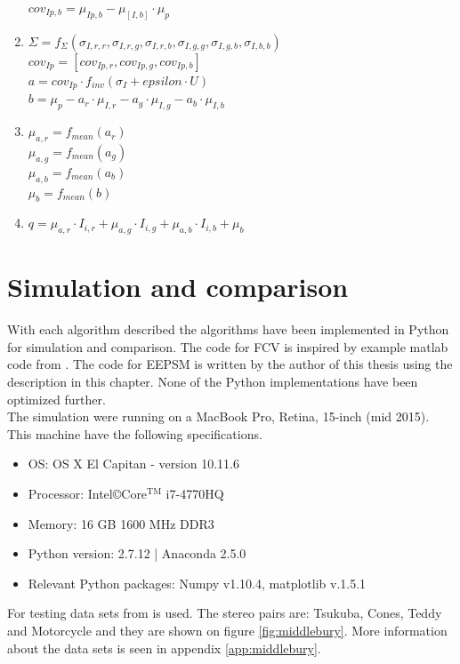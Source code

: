 \begin{enumerate}
           $cov_{Ip,b} = \mu_{Ip,b} - \mu_[I,b] \cdot \mu_p$
  \item $\Sigma = f_{\Sigma}(\sigma_{I,r,r},\sigma_{I,r,g},\sigma_{I,r,b},\sigma_{I,g,g},\sigma_{I,g,b},\sigma_{I,b,b})$\\
           $cov_{Ip}= [cov_{Ip,r}, cov_{Ip,g}, cov_{Ip,b}]$\\
           $a = cov_{Ip}\cdot f_{inv}(\sigma_I + epsilon\cdot U)$\\
           $b = \mu_p - a_r \cdot \mu_{I,r} - a_g \cdot \mu_{I,g} - a_b \cdot \mu_{I,b}$
  \item $\mu_{a,r} = f_{mean}(a_r)$\\
           $\mu_{a,g} = f_{mean}(a_g)$\\
           $\mu_{a,b} = f_{mean}(a_b)$\\
           $\mu_b = f_{mean}(b)$
  \item $q = \mu_{a,r} \cdot I_{i,r} +\mu_{a,g} \cdot I_{i,g}+\mu_{a,b} \cdot I_{i,b} + \mu_b$  
\end{enumerate}

\section{Simulation and comparison}\label{sec:simucomp}
With each algorithm described the algorithms have been implemented in Python for simulation and comparison. The code for FCV is inspired by example matlab code from \cite{hosni2013fast}. The code for EEPSM is written by the author of this thesis using the description in this chapter. None of the Python implementations have been optimized further.\\

The simulation were running on a MacBook Pro, Retina, 15-inch (mid 2015). This machine have the following specifications.
\begin{itemize}
  \item OS: OS X El Capitan - version 10.11.6
  \item Processor: Intel\copyright  Core$^{\text{TM}}$ i7-4770HQ
  \item Memory: 16 GB 1600 MHz DDR3
  \item Python version: 2.7.12 | Anaconda 2.5.0
  \item Relevant Python packages: Numpy v1.10.4, matplotlib v.1.5.1
\end{itemize}

For testing data sets from \cite{middlebury2016} is used. The stereo pairs are: Tsukuba, Cones, Teddy and Motorcycle and they are shown on figure \vref{fig:middlebury}. More information about the data sets is seen in appendix \vref{app:middlebury}.

